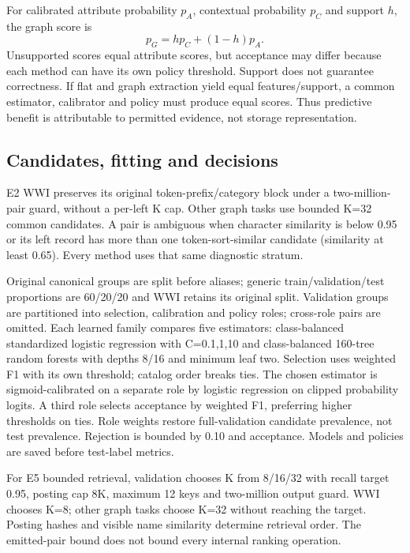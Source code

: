 \documentclass[conference,letterpaper]{IEEEtran}
\begin{document}
For calibrated attribute probability $p_A$, contextual probability $p_C$ and support $h$, the graph score is
\begin{equation}
 p_G=h p_C+(1-h)p_A.
\end{equation}
Unsupported scores equal attribute scores, but acceptance may differ because each method can have its own policy threshold. Support does not guarantee correctness. If flat and graph extraction yield equal features/support, a common estimator, calibrator and policy must produce equal scores. Thus predictive benefit is attributable to permitted evidence, not storage representation.

\subsection{Candidates, fitting and decisions}
E2 WWI preserves its original token-prefix/category block under a two-million-pair guard, without a per-left K cap. Other graph tasks use bounded K=32 common candidates. A pair is ambiguous when character similarity is below 0.95 or its left record has more than one token-sort-similar candidate (similarity at least 0.65). Every method uses that same diagnostic stratum.

Original canonical groups are split before aliases; generic train/validation/test proportions are 60/20/20 and WWI retains its original split. Validation groups are partitioned into selection, calibration and policy roles; cross-role pairs are omitted. Each learned family compares five estimators: class-balanced standardized logistic regression with C=0.1,1,10 and class-balanced 160-tree random forests with depths 8/16 and minimum leaf two. Selection uses weighted F1 with its own threshold; catalog order breaks ties. The chosen estimator is sigmoid-calibrated on a separate role by logistic regression on clipped probability logits. A third role selects acceptance by weighted F1, preferring higher thresholds on ties. Role weights restore full-validation candidate prevalence, not test prevalence. Rejection is bounded by 0.10 and acceptance. Models and policies are saved before test-label metrics.

For E5 bounded retrieval, validation chooses K from 8/16/32 with recall target 0.95, posting cap 8K, maximum 12 keys and two-million output guard. WWI chooses K=8; other graph tasks choose K=32 without reaching the target. Posting hashes and visible name similarity determine retrieval order. The emitted-pair bound does not bound every internal ranking operation.
\end{document}
